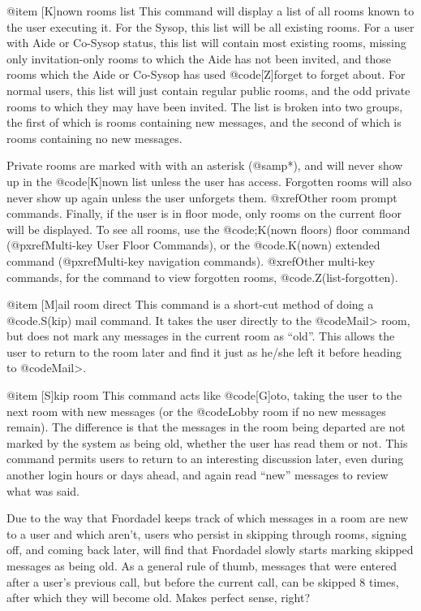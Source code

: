 @item [K]nown rooms list
This command will display a list of all rooms known to the
user executing it.  For the Sysop, this list will be all existing
rooms.  For a user with Aide or Co-Sysop status, this list will contain
most existing rooms, missing only invitation-only rooms to which the
Aide has not been invited, and those rooms which the Aide or Co-Sysop has used
@code{[Z]forget} to forget about.  For normal users, this list will just
contain regular public rooms, and the odd private rooms to which
they may have been invited.  The list is broken into two groups, the
first of which is rooms containing new messages, and the second of
which is rooms containing no new messages.

Private rooms are marked with with an asterisk (@samp{*}), and
will never show up in the @code{[K]nown list} unless the user has access.
Forgotten rooms will also never show up again unless the user
unforgets them.  @xref{Other room prompt commands}.  Finally, if the user is in
floor mode, only rooms on the current floor will be displayed.  To
see all rooms, use the @code{;K(nown floors)} floor command
(@pxref{Multi-key User Floor Commands}),
or the @code{.K(nown)} extended command (@pxref{Multi-key navigation commands}).
@xref{Other multi-key commands}, for the command to view
forgotten rooms, @code{.Z(list-forgotten)}.

@item [M]ail room direct
This command is a short-cut method of doing a @code{.S(kip) mail}
command.  It takes the user directly to the @code{Mail>} room, but does not
mark any messages in the current room as ``old''.  This allows the user
to return to the room later and find it just as he/she left it before
heading to @code{Mail>}.

@item [S]kip room
This command acts like @code{[G]oto}, taking the user to the next
room with new messages (or the @code{Lobby} room if no new messages
remain).  The difference is that the messages in the room being
departed are not marked by the system as being old, whether the user
has read them or not.  This command permits users to return to an
interesting discussion later, even during another login hours or
days ahead, and again read ``new'' messages to review what was said.

Due to the way that Fnordadel keeps track of which messages
in a room are new to a user and which aren't, users who persist in
skipping through rooms, signing off, and coming back later, will
find that Fnordadel slowly starts marking skipped messages as
being old.  As a general rule of thumb, messages that were entered
after a user's previous call, but before the current call, can be
skipped 8 times, after which they will become old.
Makes perfect sense, right?

